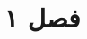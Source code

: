 \documentclass[a4paper,12pt]{book}
\begin{document}
\clearpage
\clearpage
%
\chapter{فصل ۱}





\unsetRL
 



\end{document}
